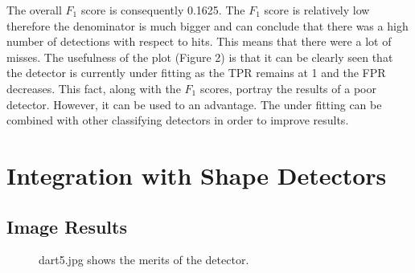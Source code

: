 \documentclass[a4paper]{article}
\begin{document}
The overall \(F_{1}\) score is consequently 0.1625. The \(F_{1}\) score is relatively low therefore the denominator is much bigger
and can conclude that there was a high number of detections with respect to hits. This means that there were a lot of misses. The usefulness of the plot (Figure 2) is that it can be clearly seen that the detector is currently under fitting as the TPR remains at 1 and the FPR decreases. This fact, along with the \(F_{1}\) scores, portray the results of a poor detector. However, it can be used to an advantage. The under fitting can be combined with other classifying detectors in order to improve results.

\section*{Integration with Shape Detectors}
\subsection*{Image Results}
\vspace{-0.7em}

\vspace{-2em}
\begin{figure}[H]
  \centering
  \hfill
   \hfill
   \hfill
   \caption{dart5.jpg shows the merits of the detector.}
\end{figure}
\vspace{-2.5em}
\end{document}
